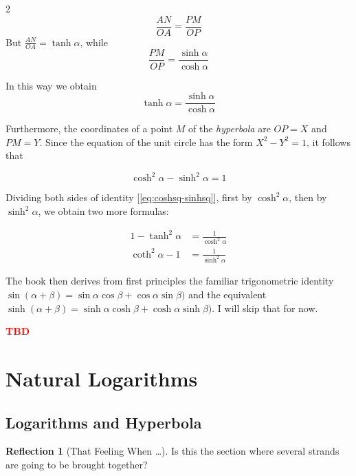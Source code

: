 \documentclass[11pt]{article}
\theoremstyle{definition}
\theoremstyle{plain}
\theoremstyle{problemstyle}
\theoremstyle{remark}
\theoremstyle{definition}
\newtheorem{reflection}{Reflection}
\begin{document}
\begin{multicols}{2}
    \[
        \frac{AN}{OA} = \frac{PM}{OP}
    \]
    But $\frac{AN}{OA}=\tanh\alpha$, while
    \[
        \frac{PM}{OP} = \frac{\sinh\alpha}{\cosh\alpha}
    \]

In this way we obtain
\begin{equation}
\label{eq:tanh-alpha}
    \tanh\alpha=\frac{\sinh\alpha}{\cosh\alpha}
\end{equation}

    Furthermore, the coordinates of a point $M$ of the \emph{hyperbola} are $OP=X$ and $PM=Y$. Since the equation of the unit circle has the form $X^2-Y^2=1$, it follows that

\begin{equation}
\label{eq:coshsq-sinhsq}
    \cosh^2\alpha-\sinh^2\alpha=1
\end{equation}

    Dividing both sides of identity [\ref{eq:coshsq-sinhsq}], first by $\cosh^2\alpha$, then by $\sinh^2\alpha$, we obtain two more formulas:

\begin{equation}
\label{eq:two-more-hyperbolic-trig-formulas}
\begin{aligned}
    1-\tanh^2\alpha&=\frac{1}{\cosh^2\alpha}\\
    \coth^2\alpha-1&=\frac{1}{\sinh^2\alpha}
\end{aligned}
\end{equation}

\end{multicols}

The book then derives from first principles the familiar trigonometric identity $\sin(\alpha+\beta)=\sin\alpha\cos\beta+\cos\alpha\sin\beta)$ and the equivalent $\sinh(\alpha+\beta)=\sinh\alpha\cosh\beta+\cosh\alpha\sinh\beta)$. I will skip that for now. 

\textcolor{red}{\textbf{TBD}} 


\section{Natural Logarithms}
\subsection{Logarithms and Hyperbola}

\begin{reflection}[That Feeling When \dots]
    Is this the section where several strands are going to be brought together?
\end{reflection}
\end{document}
